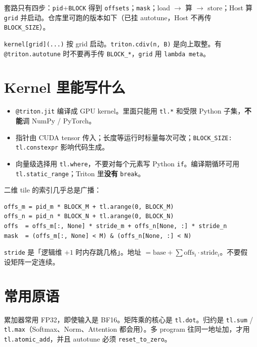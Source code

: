套路只有四步：\texttt{pid}+\texttt{BLOCK} 得到 \texttt{offsets}；\texttt{mask}；load $\to$ 算 $\to$ store；Host 算 \texttt{grid} 并启动。仓库里可跑的版本如下（已挂 autotune，Host 不再传 \texttt{BLOCK\_SIZE}）。


\begin{note}
\texttt{kernel[grid](...)} 按 grid 启动。\texttt{triton.cdiv(n, B)} 是向上取整。有 \texttt{@triton.autotune} 时不要再手传 \texttt{BLOCK\_*}，\texttt{grid} 用 \texttt{lambda meta}。
\end{note}

\section{Kernel 里能写什么}

\begin{itemize}
  \item \texttt{@triton.jit} 编译成 GPU kernel。里面只能用 \texttt{tl.*} 和受限 Python 子集，\textbf{不能}调 NumPy / PyTorch。
  \item 指针由 CUDA tensor 传入；长度等运行时标量每次可改；\texttt{BLOCK\_SIZE: tl.constexpr} 影响代码生成。
  \item 向量级选择用 \texttt{tl.where}，不要对每个元素写 Python \texttt{if}。编译期循环可用 \texttt{tl.static\_range}；Triton 里\textbf{没有} \texttt{break}。
\end{itemize}

二维 tile 的索引几乎总是广播：

\begin{lstlisting}[style=pythoncode, numbers=none]
offs_m = pid_m * BLOCK_M + tl.arange(0, BLOCK_M)
offs_n = pid_n * BLOCK_N + tl.arange(0, BLOCK_N)
offs  = offs_m[:, None] * stride_m + offs_n[None, :] * stride_n
mask  = (offs_m[:, None] < M) & (offs_n[None, :] < N)
\end{lstlisting}

\texttt{stride} 是「逻辑维 $+1$ 时内存跳几格」。地址 $=\mathrm{base}+\sum \mathrm{offs}_i\cdot\mathrm{stride}_i$。不要假设矩阵一定连续。

\figtiletwo

\section{常用原语}

累加器常用 FP32，即使输入是 BF16。矩阵乘的核心是 \texttt{tl.dot}。归约是 \texttt{tl.sum} / \texttt{tl.max}（Softmax、Norm、Attention 都会用）。多 program 往同一地址加，才用 \texttt{tl.atomic\_add}，并且 autotune 必须 \texttt{reset\_to\_zero}。

